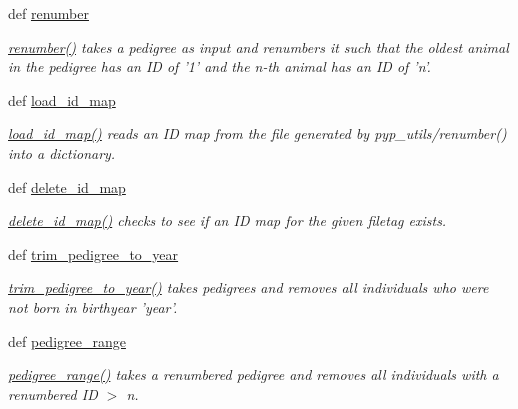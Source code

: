 \begin{CompactItemize}
def \hyperlink{namespacePyPedal_1_1pyp__utils_85325e092909bd5a86dd881933639ab1}{renumber}
\begin{CompactList}\small\item\em \hyperlink{namespacePyPedal_1_1pyp__utils_85325e092909bd5a86dd881933639ab1}{renumber()} takes a pedigree as input and renumbers it such that the oldest animal in the pedigree has an ID of '1' and the n-th animal has an ID of 'n'. \item\end{CompactList}\item 
def \hyperlink{namespacePyPedal_1_1pyp__utils_0bbe2b7b7cc968f68a916aa003a4061c}{load\_\-id\_\-map}
\begin{CompactList}\small\item\em \hyperlink{namespacePyPedal_1_1pyp__utils_0bbe2b7b7cc968f68a916aa003a4061c}{load\_\-id\_\-map()} reads an ID map from the file generated by pyp\_\-utils/renumber() into a dictionary. \item\end{CompactList}\item 
def \hyperlink{namespacePyPedal_1_1pyp__utils_b39a83bc8fb8a42eacae9c1841784e64}{delete\_\-id\_\-map}
\begin{CompactList}\small\item\em \hyperlink{namespacePyPedal_1_1pyp__utils_b39a83bc8fb8a42eacae9c1841784e64}{delete\_\-id\_\-map()} checks to see if an ID map for the given filetag exists. \item\end{CompactList}\item 
def \hyperlink{namespacePyPedal_1_1pyp__utils_2c5ccf3f25a2ef31bc3d8c671a3a5ea8}{trim\_\-pedigree\_\-to\_\-year}
\begin{CompactList}\small\item\em \hyperlink{namespacePyPedal_1_1pyp__utils_2c5ccf3f25a2ef31bc3d8c671a3a5ea8}{trim\_\-pedigree\_\-to\_\-year()} takes pedigrees and removes all individuals who were not born in birthyear 'year'. \item\end{CompactList}\item 
def \hyperlink{namespacePyPedal_1_1pyp__utils_f58fb7e6b3ffa8cd5c7f1b78d9399477}{pedigree\_\-range}
\begin{CompactList}\small\item\em \hyperlink{namespacePyPedal_1_1pyp__utils_f58fb7e6b3ffa8cd5c7f1b78d9399477}{pedigree\_\-range()} takes a renumbered pedigree and removes all individuals with a renumbered ID $>$ n. \item\end{CompactList}\item 

\end{CompactItemize}
